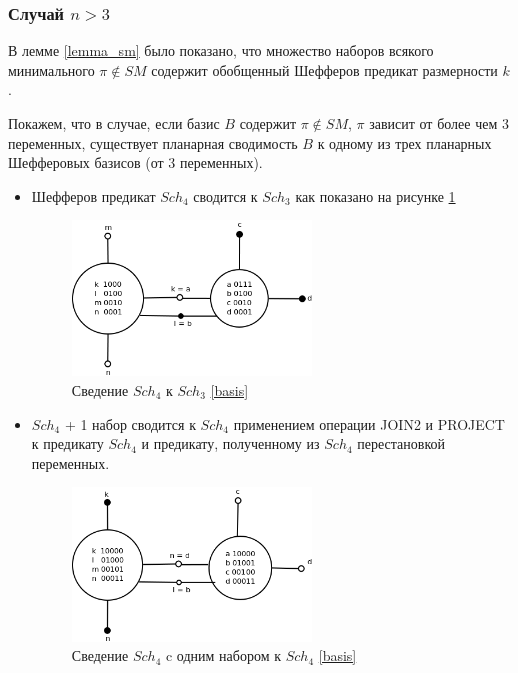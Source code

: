 \documentclass[12pt]{article}
\begin{document}
\subsubsection{Случай $n > 3$}
В лемме \ref{lemma_sm} было показано, что множество наборов всякого минимального $\pi \notin SM$ содержит обобщенный
Шефферов предикат размерности $k$.

Покажем, что в случае, если базис $B$ содержит $\pi \notin SM$, $\pi$ зависит от более чем 3 переменных, существует планарная
сводимость $B$ к одному из трех планарных Шефферовых базисов (от 3 переменных).

\begin{itemize}
\item Шефферов предикат $Sch_4$ сводится к $Sch_3$ как показано на рисунке \ref{fig:4to3}
\begin{figure}[htb]
\centering
\includegraphics[width=0.6\textwidth]{4to3.png}
\caption{Сведение $Sch_4$ к $Sch_3$ \ref{basis}}
\label{fig:4to3}
\end{figure}

\item $Sch_4$ + 1 набор сводится к $Sch_4$ применением операции JOIN2 и PROJECT к предикату $Sch_4$ и предикату, 
полученному из $Sch_4$ перестановкой переменных. 
\begin{figure}[htb]
\centering
\includegraphics[width=0.6\textwidth]{4_1to4.png}
\caption{Сведение $Sch_4$ c одним набором к $Sch_4$ \ref{basis}}
\label{fig:4_1to4}
\end{figure}


\end{itemize}
\end{document}
